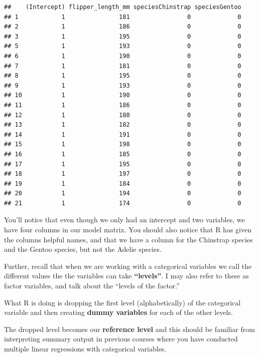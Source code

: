 \documentclass[
  openany]{book}
\begin{document}
\begin{verbatim}
##    (Intercept) flipper_length_mm speciesChinstrap speciesGentoo
## 1            1               181                0             0
## 2            1               186                0             0
## 3            1               195                0             0
## 5            1               193                0             0
## 6            1               190                0             0
## 7            1               181                0             0
## 8            1               195                0             0
## 9            1               193                0             0
## 10           1               190                0             0
## 11           1               186                0             0
## 12           1               180                0             0
## 13           1               182                0             0
## 14           1               191                0             0
## 15           1               198                0             0
## 16           1               185                0             0
## 17           1               195                0             0
## 18           1               197                0             0
## 19           1               184                0             0
## 20           1               194                0             0
## 21           1               174                0             0
\end{verbatim}

You'll notice that even though we only had an intercept and two variables, we have four columns in our model matrix. You should also notice that R has given the columns helpful names, and that we have a column for the Chinstrap species and the Gentoo species, but not the Adelie species.

Further, recall that when we are working with a categorical variables we call the different values the the variables can take \textbf{``levels''}. I may also refer to these as factor variables, and talk about the ``levels of the factor.''

What R is doing is dropping the first level (alphabetically) of the categorical variable and then creating \textbf{dummy variables} for each of the other levels.

The dropped level becomes our \textbf{reference level} and this should be familiar from interpreting summary output in previous courses where you have conducted multiple linear regressions with categorical variables.
\end{document}
